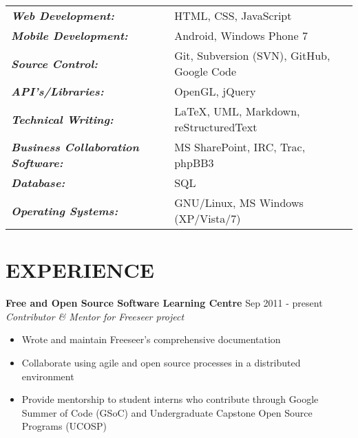 \documentclass[margin]{res}
\begin{document}
\begin{resume}
\begin{tabular}{l l}
	{\sl \textbf{Web Development:}} &
	HTML, CSS, JavaScript \\

	{\sl \textbf{Mobile Development:}} &
	Android, Windows Phone 7 \\

	{\sl \textbf{Source Control:}} &
	Git, Subversion (SVN), GitHub, Google Code \\

	{\sl \textbf{API's/Libraries:}} &
	OpenGL, jQuery \\

	{\sl \textbf{Technical Writing:}} &
	\LaTeX, UML, Markdown, reStructuredText \\

	{\sl \textbf{Business Collaboration Software:}} &
  MS SharePoint, IRC, Trac, phpBB3 \\
	  
	{\sl \textbf{Database:}} &	  
  SQL \\	  
	  
	{\sl \textbf{Operating Systems:}} &
  GNU/Linux, MS Windows (XP/Vista/7)

	\end{tabular}	 

\section{EXPERIENCE}

	\textbf{Free and Open Source Software Learning Centre} \hfill Sep 2011 - present \\
    {\sl Contributor \& Mentor for Freeseer project} \hfill %
	\begin{itemize}  \itemsep -2pt %
	  \item Wrote and maintain Freeseer's comprehensive documentation
	  \item Collaborate using agile and open source processes in a distributed environment
	  \item Provide mentorship to student interns who contribute through Google Summer of Code (GSoC)
	        and Undergraduate Capstone Open Source Programs (UCOSP)
	\end{itemize}


\end{resume}
\end{document}
